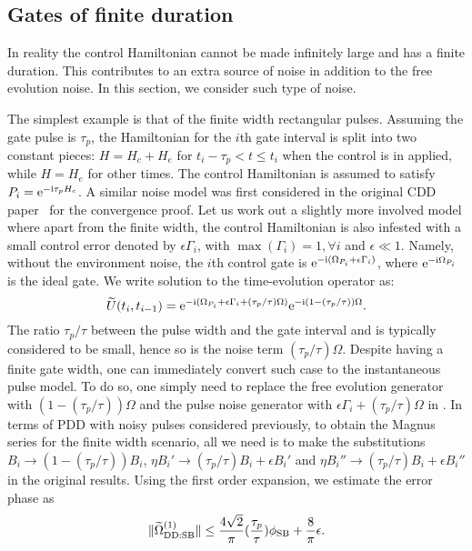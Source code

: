 \documentclass[b5paper,11pt]{article}
\newcommand{\wt}[1]{\widetilde{#1}}
\newcommand{\rDD}{\mathrm{DD}}
\begin{document}
\subsection{Gates of finite duration}
In reality the control Hamiltonian cannot be made infinitely large and 
has a finite duration. This contributes to an extra source of noise in addition
to the free evolution noise.  In this section, we consider such type of noise. 

The simplest example is that of the finite width rectangular pulses. Assuming the gate pulse is $\tau_p$, the Hamiltonian  for the $i$th gate interval is split into two constant pieces: $H=H_c+H_e$ for $t_i -\tau_p  < t \le t_{i}$ when the control is in applied, while $H=H_e$ for other times. The control Hamiltonian is assumed to satisfy $P_i = \mathrm{e}^{-\mathrm{i} \tau_p H_c }$.
A similar noise model was first considered in the original CDD paper~\!\cite{khodjasteh2007performance} for the convergence proof. Let us work out a slightly more involved model where apart from the finite width, the control Hamiltonian is also infested with a small control error denoted by $\epsilon\Gamma_i$, with $\max{(\Gamma_i)}=1, \forall i$ and $\epsilon\ll 1$.  Namely, without the environment noise, the $i$th control gate
is $ \mathrm{e}^{-\mathrm{i} (\Omega_{P_i} +\epsilon \Gamma_i)}$, where $\mathrm{e}^{-\mathrm{i} \Omega_{P_i} }$ is the ideal gate. 
We write solution to the time-evolution operator as:
\begin{equation}
 \wt U(t_{i},t_{i-1}) =  \upe^{-\upi (\Omega_{P_i} +\epsilon \Gamma_i+
 (\tau_p/\tau) \Omega)}  \upe^{-\upi (1-(\tau_p/\tau)) \Omega}.
\end{equation}
The ratio $\tau_p/\tau$ between the pulse width and the gate interval and is typically considered to be small, hence so is the noise term $(\tau_p/\tau)\Omega$. Despite having a finite gate width,  one can immediately convert such case to the instantaneous pulse model.
To do so, one simply need to replace the free evolution generator with $ (1-(\tau_p/\tau)) \Omega$ and the pulse noise generator  with $\epsilon \Gamma_i + (\tau_p/\tau) \Omega$ in .
In terms of PDD with noisy pulses considered previously, to obtain the Magnus series for the finite width scenario, all we need is to make the substitutions $B_i \to (1-(\tau_p/\tau)) B_i$, $\eta B_i' \to (\tau_p/\tau) B_i + \epsilon B_i'$ and $\eta B_i'' \to (\tau_p/\tau) B_i + \epsilon B_i''$ in the original results. Using the first order expansion, we estimate the error phase as 
\begin{equation}
\norm{ \wt\Omega_{\rDD:\rSB}\up{1} }\le \frac{4\sqrt{2}}{\pi} (\frac{\tau_p}{\tau})\phi_\rSB +  \frac{8}{\pi} \epsilon.
\end{equation}
\end{document}
